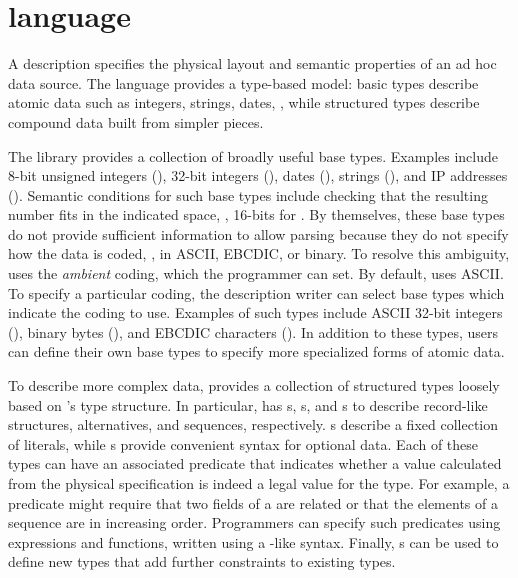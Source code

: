 \section{\PADS{} language}
A \pads{} description specifies the physical layout and 
semantic properties of an ad hoc data source. 
The language provides a type-based model:
basic types describe atomic data such as integers, strings, dates, \etc{}, while
structured types describe compound data built from simpler pieces.
\suppressfloats

The \pads{} library provides a collection of broadly useful base
types.  Examples include 8-bit unsigned integers (), 32-bit
integers (), dates (), strings (),
and IP addresses ().  Semantic conditions for such base types
include checking that the resulting number fits in the indicated
space, \ie, 16-bits for .  By themselves, these base types
do not provide sufficient information to allow parsing because they do
not specify how the data is coded, \ie{}, in ASCII, EBCDIC, or binary.
To resolve this ambiguity, \pads{} uses the \textit{ambient} coding,
which the programmer can set.  By default, \pads{} uses ASCII.  To
specify a particular coding, the description writer can select base
types which indicate the coding to use.  Examples of such types
include ASCII 32-bit integers (), binary bytes
(), and EBCDIC characters ().  In addition to
these types, users can define their own base types to specify more
specialized forms of atomic data.

To describe more complex data, \pads{} provides a collection of 
structured types loosely based on \C{}'s type structure.
In particular, \pads{} has 
s, s, and s to describe
record-like structures, alternatives, and sequences, respectively.
s describe a fixed collection of literals, while s 
provide convenient syntax for optional data.
Each of these
types can have an associated predicate that indicates whether a
value calculated from the physical specification is indeed a legal
value for the type.  For example, a predicate might require that two
fields of a  are related or that the elements
of a sequence are in increasing order.  Programmers can specify such
predicates using \pads{} expressions and functions, 
written using a \C{}-like syntax.
Finally, \pads{} s can be used
to define new types that add further constraints to existing types.

